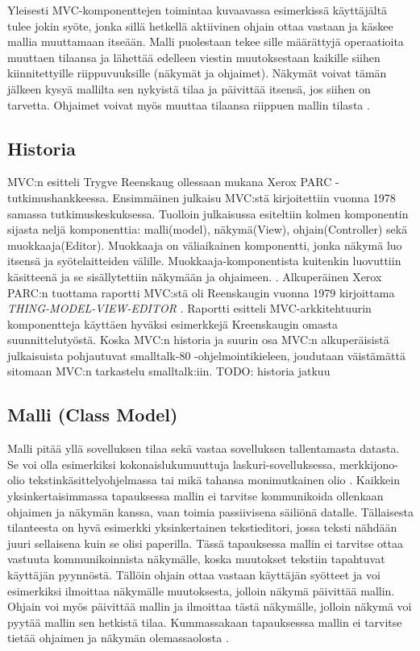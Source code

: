 \documentclass[finnish,utf8,nonumbib,palatino,kandi]{gradu2}
\begin{document}
Yleisesti MVC-komponenttejen toimintaa kuvaavassa esimerkissä käyttäjältä tulee jokin syöte, jonka sillä hetkellä aktiivinen ohjain ottaa vastaan ja käskee mallia muuttamaan itseään. Malli puolestaan
tekee sille määrättyjä operaatioita muuttaen tilaansa ja lähettää edelleen viestin muutoksestaan kaikille siihen kiinnitettyille riippuvuuksille (näkymät ja ohjaimet). Näkymät
voivat tämän jälkeen kysyä mallilta sen nykyistä tilaa ja päivittää itsensä, jos siihen on tarvetta. Ohjaimet voivat myös muuttaa tilaansa riippuen mallin tilasta \cite{Krasner:desc}.

\subsection{Historia}

MVC:n esitteli Trygve Reenskaug ollessaan mukana Xerox PARC -tutkimushankkeessa. Ensimmäinen julkaisu MVC:stä
kirjoitettiin vuonna 1978 samassa tutkimuskeskuksessa. Tuolloin julkaisussa esiteltiin kolmen komponentin sijasta neljä
komponenttia: malli(model), näkymä(View), ohjain(Controller) sekä muokkaaja(Editor). Muokkaaja on väliaikainen komponentti, jonka näkymä
luo itsensä ja syötelaitteiden välille. Muokkaaja-komponentista kuitenkin luovuttiin käsitteenä ja se sisällytettiin näkymään ja ohjaimeen. \cite{Reenskaug}.
Alkuperäinen Xerox PARC:n tuottama raportti MVC:stä oli Reenskaugin vuonna 1979 kirjoittama \emph{THING-MODEL-VIEW-EDITOR} \cite{reenskaug:1979}. Raportti 
esitteli MVC-arkkitehtuurin komponentteja käyttäen hyväksi esimerkkejä Kreenskaugin omasta suunnittelutyöstä. Koska MVC:n historia ja suurin osa MVC:n
alkuperäisistä julkaisuista pohjautuvat smalltalk-80 -ohjelmointikieleen, joudutaan väistämättä sitomaan MVC:n tarkastelu smalltalk:iin.  TODO: historia jatkuu 

\subsection{Malli (Class Model)}
Malli pitää yllä sovelluksen tilaa sekä vastaa sovelluksen tallentamasta datasta. Se voi olla esimerkiksi kokonaislukumuuttuja laskuri-sovelluksessa, merkkijono-olio tekstinkäsittelyohjelmassa tai
mikä tahansa monimutkainen olio \cite{Krasner}. Kaikkein yksinkertaisimmassa tapauksessa mallin ei tarvitse kommunikoida ollenkaan ohjaimen ja näkymän kanssa, vaan toimia passiivisena säiliönä datalle. 
Tällaisesta tilanteesta on hyvä esimerkki yksinkertainen tekstieditori, jossa teksti nähdään juuri sellaisena kuin se olisi paperilla. Tässä tapauksessa mallin ei tarvitse ottaa vastuuta
kommunikoinnista näkymälle, koska muutokset tekstiin tapahtuvat käyttäjän pyynnöstä. Tällöin ohjain ottaa vastaan käyttäjän syötteet ja voi esimerkiksi ilmoittaa näkymälle muutoksesta, jolloin näkymä
päivittää mallin. Ohjain voi myös päivittää mallin ja ilmoittaa tästä näkymälle, jolloin näkymä voi pyytää mallin sen hetkistä tilaa. Kummassakaan tapauksesssa mallin ei tarvitse tietää ohjaimen ja näkymän
olemassaolosta \cite{Burbeck}. 
\end{document}
